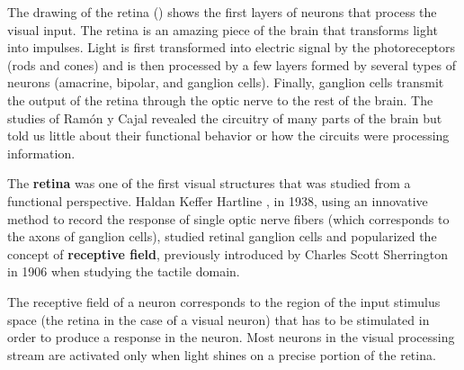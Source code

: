 The drawing of the retina (\fig{\ref{fig:cajal}}) shows the first layers of neurons that process the visual input. The retina is an amazing piece of the brain that transforms light into impulses. Light is first transformed into electric signal by the photoreceptors
(rods and cones) and is then processed by a few layers formed by several types of neurons (amacrine, bipolar, and ganglion cells). Finally, ganglion cells transmit the output of the retina through the optic nerve to the rest of the brain. The studies of Ram\'{o}n y Cajal revealed the circuitry of many parts of the brain but told us little about their functional behavior or how the circuits were processing information.

The {\bf retina}
was one of the first visual structures that was studied from a functional perspective. Haldan Keffer Hartline \cite{Hartline1938}, in 1938, using an innovative method to record the response of single optic nerve fibers (which corresponds to the axons of ganglion cells),
studied retinal ganglion cells and popularized the concept of {\bf receptive field}, previously introduced by Charles Scott Sherrington \cite{Sherrington1906} in 1906 when studying the tactile domain.


The receptive field of a  neuron corresponds to the region of the input stimulus space (the retina in the case of a visual neuron) that has to be stimulated in order to produce a response in the neuron. Most neurons in the visual processing stream are activated only when light shines on a precise portion of the retina.


